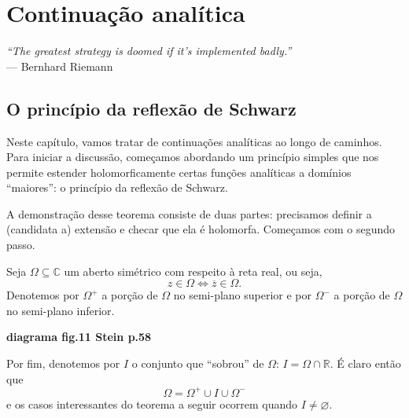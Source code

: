 \chapter[Continuação analítica]{Continuação analítica}
\chaptermark{}

\hfill%
\begin{minipage}{10cm}
\begin{flushright}
\rightskip=0.5cm
\textit{``The greatest strategy is doomed if it's implemented badly.''}
\\[0.1cm]
\rightskip=0.5cm
--- Bernhard Riemann
\end{flushright}
\end{minipage}

\section{O princípio da reflexão de Schwarz}


Neste capítulo, vamos tratar de continuações analíticas ao longo de caminhos.
Para iniciar a discussão, começamos abordando um princípio simples que nos permite
estender holomorficamente certas funções analíticas a domínios ``maiores'': 
o princípio da reflexão de Schwarz.

A demonstração desse teorema consiste de duas partes: precisamos definir a 
(candidata a) extensão e checar que ela é holomorfa. Começamos com o segundo passo.

Seja $\Omega\subseteq\mathbb{C}$ um aberto simétrico com respeito à reta real, ou seja,
\begin{equation*}
    z\in\Omega \iff \overline{z}\in\Omega.
\end{equation*}
Denotemos por $\Omega^+$ a porção de $\Omega$ no semi-plano superior e por $\Omega^-$
a porção de $\Omega$ no semi-plano inferior.

\begin{center}
    \textbf{diagrama fig.11 Stein p.58}
\end{center}

Por fim, denotemos por $I$ o conjunto que ``sobrou'' de $\Omega$: 
$I = \Omega\cap\mathbb{R}$. É claro então que
\begin{equation*}
    \Omega = \Omega^+ \cup I \cup \Omega^-
\end{equation*}
e os casos interessantes do teorema a seguir ocorrem quando $I\neq\varnothing$.


